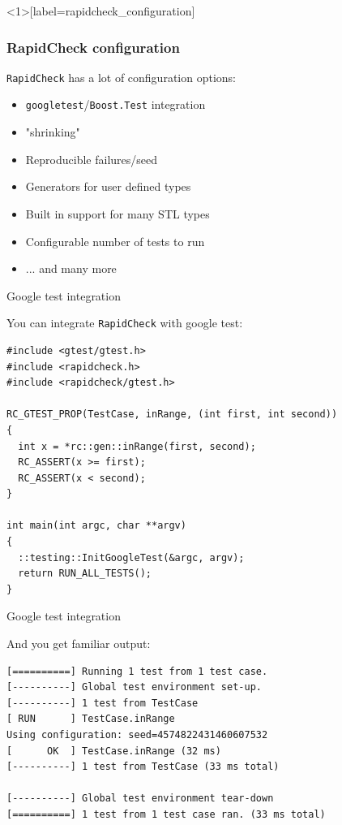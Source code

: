 \documentclass{beamer}
\begin{document}

\begin{frame}<1>[label=rapidcheck_configuration]
\frametitle{RapidCheck configuration}

\texttt{RapidCheck} has a lot of configuration options:

\begin{itemize}[<+- | alert@+>]
\item \texttt{googletest}/\texttt{Boost.Test} integration
\item "shrinking"
\item Reproducible failures/seed
\item Generators for user defined types
\item Built in support for many STL types
\item Configurable number of tests to run
\item ... and many more
\end{itemize}

\end{frame}


\begin{frame}[fragile]{Google test integration}

You can integrate \texttt{RapidCheck} with google test:

\begin{lstlisting}[style=cpp]
#include <gtest/gtest.h>
#include <rapidcheck.h>
#include <rapidcheck/gtest.h>

RC_GTEST_PROP(TestCase, inRange, (int first, int second))
{
  int x = *rc::gen::inRange(first, second);
  RC_ASSERT(x >= first);
  RC_ASSERT(x < second);
}

int main(int argc, char **argv)
{
  ::testing::InitGoogleTest(&argc, argv);
  return RUN_ALL_TESTS();
}
\end{lstlisting}

\end{frame}


\begin{frame}[fragile]{Google test integration}

And you get familiar output:

\begin{lstlisting}[style=gtest]
[==========] Running 1 test from 1 test case.
[----------] Global test environment set-up.
[----------] 1 test from TestCase
[ RUN      ] TestCase.inRange
Using configuration: seed=4574822431460607532
[      OK  ] TestCase.inRange (32 ms)
[----------] 1 test from TestCase (33 ms total)

[----------] Global test environment tear-down
[==========] 1 test from 1 test case ran. (33 ms total)
\end{lstlisting}

\end{frame}
\end{document}

